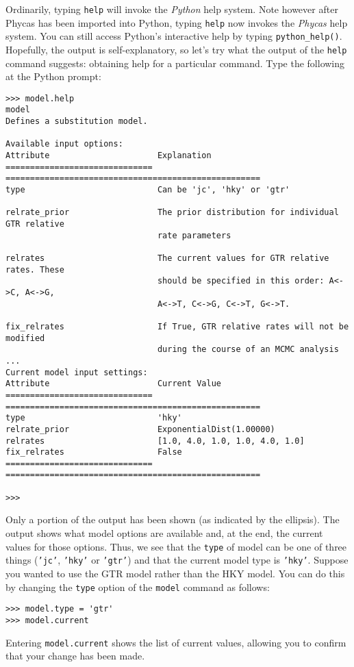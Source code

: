 \documentclass[10pt]{article}
\newcommand{\code}[1]{{\tt #1}}				%
\newcommand{\cmd}[1]{{\tt \small #1}\index{#1}}		%
\newcommand{\opt}[1]{{\tt \small #1}\index{#1}}		%
\newcommand{\optval}[1]{{\tt #1}}			%
\begin{document}
Ordinarily, typing \cmd{help} will invoke the {\em Python} help system. Note however after Phycas has been imported into Python, typing \cmd{help} now invokes the {\em Phycas} help system. You can still access Python's interactive help by typing \cmd{python\_help()}. Hopefully, the output is self-explanatory, so let's try what the output of the \cmd{help} command suggests: obtaining help for a particular command. Type the following at the Python prompt:
\begin{verbatim}
>>> model.help
model
Defines a substitution model.

Available input options:
Attribute                      Explanation
============================== ====================================================
type                           Can be 'jc', 'hky' or 'gtr'

relrate_prior                  The prior distribution for individual GTR relative
                               rate parameters

relrates                       The current values for GTR relative rates. These 
                               should be specified in this order: A<->C, A<->G, 
                               A<->T, C<->G, C<->T, G<->T.

fix_relrates                   If True, GTR relative rates will not be modified
                               during the course of an MCMC analysis
...
Current model input settings:
Attribute                      Current Value
============================== ====================================================
type                           'hky'
relrate_prior                  ExponentialDist(1.00000)
relrates                       [1.0, 4.0, 1.0, 1.0, 4.0, 1.0]
fix_relrates                   False
============================== ====================================================

>>> 
\end{verbatim}

Only a portion of the output has been shown (as indicated by the ellipsis). The output shows what model options are available and, at the end, the current values for those options. Thus, we see that the \opt{type} of model can be one of three things (\optval{'jc'}, \optval{'hky'} or \optval{'gtr'}) and that the current model type is \optval{'hky'}. Suppose you wanted to use the GTR model rather than the HKY model. You can do this by changing the \opt{type} option of the \cmd{model} command as follows:
\begin{verbatim}
>>> model.type = 'gtr'
>>> model.current
\end{verbatim}
Entering \code{model.current} shows the list of current values, allowing you to confirm that your change has been made.
\end{document}
